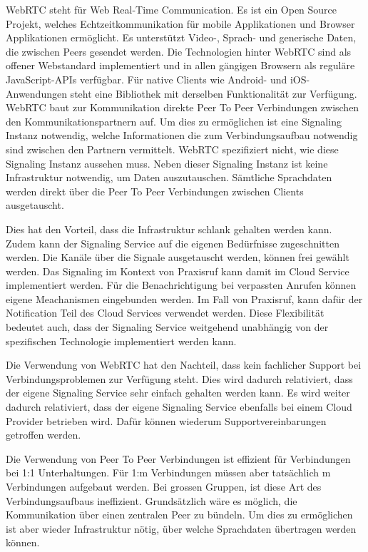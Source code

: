 WebRTC steht für Web Real-Time Communication.
Es ist ein Open Source Projekt, welches Echtzeitkommunikation für mobile Applikationen und Browser Applikationen ermöglicht.
Es unterstützt Video-, Sprach- und generische Daten, die zwischen Peers gesendet werden.
Die Technologien hinter WebRTC sind als offener Webstandard implementiert und in allen gängigen Browsern als reguläre JavaScript-APIs verfügbar.
Für native Clients wie Android- und iOS-Anwendungen steht eine Bibliothek mit derselben Funktionalität zur Verfügung.\cite{webrtc}
WebRTC baut zur Kommunikation direkte Peer To Peer Verbindungen zwischen den Kommunikationspartnern auf.
Um dies zu ermöglichen ist eine Signaling Instanz notwendig, welche Informationen die zum Verbindungsaufbau notwendig sind zwischen den Partnern vermittelt.
WebRTC spezifiziert nicht, wie diese Signaling Instanz aussehen muss.
Neben dieser Signaling Instanz ist keine Infrastruktur notwendig, um Daten auszutauschen.
Sämtliche Sprachdaten werden direkt über die Peer To Peer Verbindungen zwischen Clients ausgetauscht.

Dies hat den Vorteil, dass die Infrastruktur schlank gehalten werden kann.
Zudem kann der Signaling Service auf die eigenen Bedürfnisse zugeschnitten werden.
Die Kanäle über die Signale ausgetauscht werden, können frei gewählt werden.
Das Signaling im Kontext von Praxisruf kann damit im Cloud Service implementiert werden.
Für die Benachrichtigung bei verpassten Anrufen können eigene Meachanismen eingebunden werden.
Im Fall von Praxisruf, kann dafür der Notification Teil des Cloud Services verwendet werden.
Diese Flexibilität bedeutet auch, dass der Signaling Service weitgehend unabhängig von der spezifischen Technologie implementiert werden kann.

\clearpage

Die Verwendung von WebRTC hat den Nachteil, dass kein fachlicher Support bei Verbindungsproblemen zur Verfügung steht.
Dies wird dadurch relativiert, dass der eigene Signaling Service sehr einfach gehalten werden kann.
Es wird weiter dadurch relativiert, dass der eigene Signaling Service ebenfalls bei einem Cloud Provider betrieben wird.
Dafür können wiederum Supportvereinbarungen getroffen werden.

Die Verwendung von Peer To Peer Verbindungen ist effizient für Verbindungen bei 1:1 Unterhaltungen.
Für 1:m Verbindungen müssen aber tatsächlich m Verbindungen aufgebaut werden.
Bei grossen Gruppen, ist diese Art des Verbindungsaufbaus ineffizient.
Grundsätzlich wäre es möglich, die Kommunikation über einen zentralen Peer zu bündeln.\cite{webrtc_mesh}
Um dies zu ermöglichen ist aber wieder Infrastruktur nötig, über welche Sprachdaten übertragen werden können.

